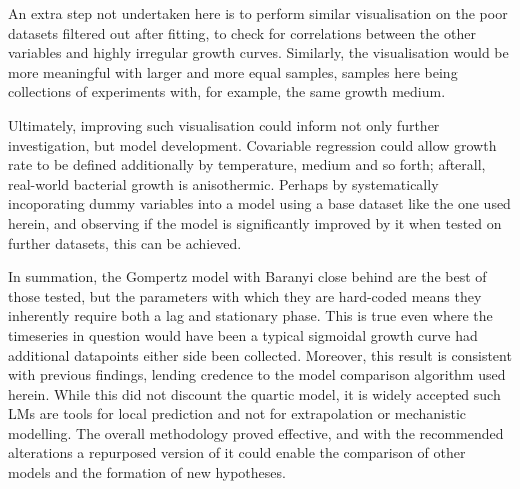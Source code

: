 \documentclass[11pt]{article}
\begin{document}
An extra step not undertaken here is to perform similar visualisation on the poor datasets filtered out after fitting, to check for correlations between the other variables and highly irregular growth curves. Similarly, the visualisation would be more meaningful with larger and more equal samples, samples here being collections of experiments with, for example, the same growth medium.

Ultimately, improving such visualisation could inform not only further investigation, but model development. Covariable regression could allow growth rate to be defined additionally by temperature, medium and so forth; afterall, real-world bacterial growth is anisothermic. Perhaps by systematically incoporating dummy variables into a model using a base dataset like the one used herein, and observing if the model is significantly improved by it when tested on further datasets, this can be achieved.\parencites{Suits2016}

In summation, the Gompertz model with Baranyi close behind are the best of those tested, but the parameters with which they are hard-coded means they inherently require both a lag and stationary phase. This is true even where the timeseries in question would have been a typical sigmoidal growth curve had additional datapoints either side been collected. Moreover, this result is consistent with previous findings, lending credence to the model comparison algorithm used herein. While this did not discount the quartic model, it is widely accepted such LMs are tools for local prediction and not for extrapolation or mechanistic modelling. The overall methodology proved effective, and with the recommended alterations a repurposed version of it could enable the comparison of other models and the formation of new hypotheses.


\newpage

\printbibliography[heading=bibintoc]
\end{document}
